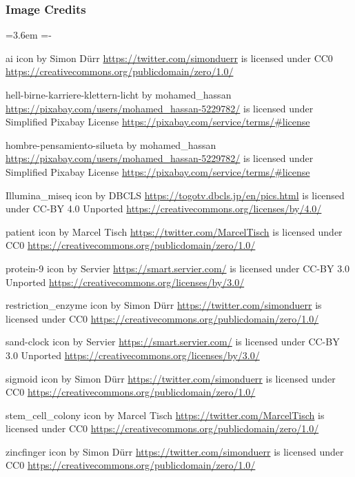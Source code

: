 \documentclass[10pt, british, luatex]{beamer}
\begin{document}
\begin{frame}[allowframebreaks]
	\frametitle{Image Credits}
	{%
		\leftskip=3.6em%
		\parindent=-\leftskip%
		\parskip=0pt%

		\textcolor{primary_inverse_fg}{ai} icon by Simon Dürr \url{https://twitter.com/simonduerr} is licensed under CC0 \url{https://creativecommons.org/publicdomain/zero/1.0/}

		\textcolor{primary_inverse_fg}{hell-birne-karriere-klettern-licht} by mohamed\_hassan \url{https://pixabay.com/users/mohamed_hassan-5229782/} is licensed under Simplified Pixabay License \url{https://pixabay.com/service/terms/\#license}

		\textcolor{primary_inverse_fg}{hombre-pensamiento-silueta} by mohamed\_hassan \url{https://pixabay.com/users/mohamed_hassan-5229782/} is licensed under Simplified Pixabay License \url{https://pixabay.com/service/terms/\#license}

		\textcolor{primary_inverse_fg}{Illumina\_miseq} icon by DBCLS \url{https://togotv.dbcls.jp/en/pics.html} is licensed under CC-BY 4.0 Unported \url{https://creativecommons.org/licenses/by/4.0/}

		\textcolor{primary_inverse_fg}{patient} icon by Marcel Tisch \url{https://twitter.com/MarcelTisch} is licensed under CC0 \url{https://creativecommons.org/publicdomain/zero/1.0/}

		\textcolor{primary_inverse_fg}{protein-9} icon by Servier \url{https://smart.servier.com/} is licensed under CC-BY 3.0 Unported \url{https://creativecommons.org/licenses/by/3.0/}

		\textcolor{primary_inverse_fg}{restriction\_enzyme} icon by Simon Dürr \url{https://twitter.com/simonduerr} is licensed under CC0 \url{https://creativecommons.org/publicdomain/zero/1.0/}

		\textcolor{primary_inverse_fg}{sand-clock} icon by Servier \url{https://smart.servier.com/} is licensed under CC-BY 3.0 Unported \url{https://creativecommons.org/licenses/by/3.0/}

		\textcolor{primary_inverse_fg}{sigmoid} icon by Simon Dürr \url{https://twitter.com/simonduerr} is licensed under CC0 \url{https://creativecommons.org/publicdomain/zero/1.0/}

		\textcolor{primary_inverse_fg}{stem\_cell\_colony} icon by Marcel Tisch \url{https://twitter.com/MarcelTisch} is licensed under CC0 \url{https://creativecommons.org/publicdomain/zero/1.0/}

		\textcolor{primary_inverse_fg}{zincfinger} icon by Simon Dürr \url{https://twitter.com/simonduerr} is licensed under CC0 \url{https://creativecommons.org/publicdomain/zero/1.0/}

	}
\end{frame}
\end{document}
